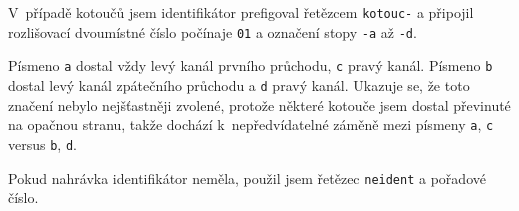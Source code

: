 V~případě
kotoučů jsem identifikátor prefigoval řetězcem \texttt{kotouc-} a připojil
rozlišovací dvoumístné číslo počínaje \texttt{01} a označení stopy \texttt{-a}
až \texttt{-d}.

Písmeno \texttt{a} dostal vždy levý kanál prvního průchodu, \texttt{c} pravý
kanál. Písmeno \texttt{b} dostal levý kanál zpátečního průchodu a \texttt{d}
pravý kanál. Ukazuje se, že toto značení nebylo nejšťastněji zvolené, protože
některé kotouče jsem dostal převinuté na opačnou stranu, takže dochází
k~nepředvídatelné záměně mezi písmeny \texttt{a}, \texttt{c} versus \texttt{b},
\texttt{d}.

Pokud nahrávka identifikátor neměla, použil jsem řetězec \texttt{neident} a
pořadové číslo.

%
